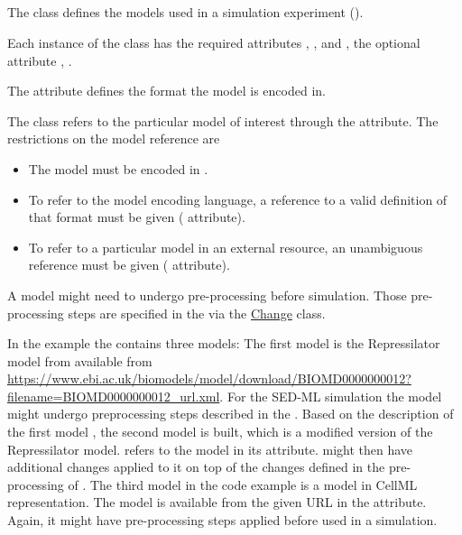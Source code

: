 \subsection{}
\label{class:model}
The  class defines the models used in a simulation experiment ().


Each instance of the  class has the required attributes \hyperref[sec:id]{}, \hyperref[sec:model_source]{}, and \hyperref[sec:language]{}, the optional attribute \hyperref[sec:name]{},  \hyperref[sec:changesModel]{}.

The \hyperref[sec:language]{} attribute defines the format the model is encoded in.

The  class refers to the particular model of interest through the \hyperref[sec:model_source]{} attribute. The restrictions on the model reference are
\begin{itemize}
 \item{The model must be encoded in .}
 \item{To refer to the model encoding language, a reference to a valid definition of that format must be given (\hyperref[sec:language]{} attribute).}
 \item{To refer to a particular model in an external resource, an unambiguous reference must be given (\hyperref[sec:model_source]{} attribute).}
\end{itemize}

A model might need to undergo pre-processing before simulation. Those pre-processing steps are specified in the \hyperref[sec:changesModel]{} via the \hyperref[class:change]{Change} class.


In the example the \hyperref[class:listOfModels]{} contains three models: The first model  is the Repressilator model from \biom available from \url{https://www.ebi.ac.uk/biomodels/model/download/BIOMD0000000012?filename=BIOMD0000000012_url.xml}. For the SED-ML simulation the model might undergo preprocessing steps described in the \hyperref[sec:changesModel]{}. Based on the description of the first model , the second model  is built, which is a modified version of the Repressilator model.  refers to the model  in its \hyperref[sec:model_source]{} attribute.  might then have additional changes applied to it on top of the changes defined in the pre-processing of . The third model in the code example is a model in CellML representation. The model  is available from the given URL in the \hyperref[sec:model_source]{} attribute. Again, it might have pre-processing steps applied before used in a simulation.

